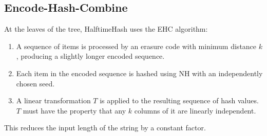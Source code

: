 \documentclass[runningheads]{llncs}
\newcommand{\ints}{\mathbb{Z}}
\begin{document}


\subsection{Encode-Hash-Combine}

At the leaves of the tree, HalftimeHash uses the EHC algorithm: \cite{ehc-nandi}

\begin{enumerate}
\item A sequence of items is processed by an erasure code with minimum distance $k$, producing a slightly longer encoded sequence.
\item Each item in the encoded sequence is hashed using NH with an independently chosen seed.
\item A linear transformation $T$ is applied to the resulting sequence of hash values.
  $T$ must have the property that any $k$ columns of it are linearly independent.
\end{enumerate}

This reduces the input length of the string by a constant factor.




\end{document}
